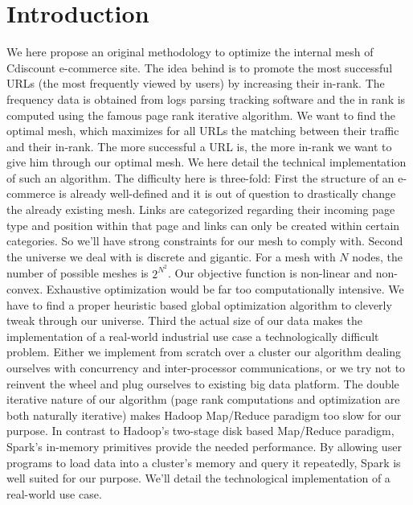 \documentclass{iSWAGArticle}
\begin{document}
\section{Introduction}
We here propose an original methodology to optimize the internal mesh of Cdiscount e-commerce site.
The idea behind is to promote the most successful URLs (the most frequently viewed by users) by increasing their in-rank.  
The frequency data is obtained from logs parsing tracking software and the in rank is computed using the famous page rank iterative algorithm.  
We want to find the optimal mesh, which maximizes for all URLs the matching between their traffic and their in-rank. 
The more successful a URL is, the more in-rank we want to give him through our optimal mesh.
\newline
We here detail the technical implementation of such an algorithm.
The difficulty here is three-fold:
\newline
\indent
First the structure of an e-commerce is already well-defined and it is out of question to drastically change the already existing mesh.
Links are categorized regarding their incoming page type and position within that page and links can only be created within certain categories. 
So we'll have strong constraints for our mesh to comply with.
\newline
\indent
Second the universe we deal with is discrete and gigantic. 
For a mesh with $N$ nodes, the number of possible meshes is $2^{N^{2}}$. 
Our objective function is non-linear and non-convex. Exhaustive optimization would be far too computationally intensive. 
We have to find a proper heuristic based global optimization algorithm to cleverly tweak through our universe.
\newline
\indent
Third the actual size of our data makes the implementation of a real-world industrial use case a technologically difficult problem.
Either we implement from scratch over a cluster our algorithm dealing ourselves with concurrency and inter-processor communications,
or we try not to reinvent the wheel and plug ourselves to existing big data platform.
The double iterative nature of our algorithm (page rank computations and optimization are both naturally iterative)
makes Hadoop Map/Reduce paradigm too slow for our purpose. 
In contrast to Hadoop's two-stage disk based Map/Reduce paradigm, Spark's in-memory primitives provide the needed performance.
By allowing user programs to load data into a cluster's memory and query it repeatedly, Spark is well suited for our purpose.
We'll detail the technological implementation of a real-world use case.
\end{document}
